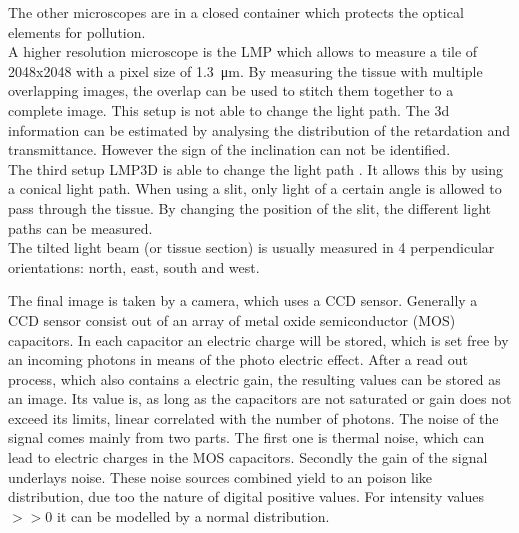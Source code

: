 The other microscopes are in a closed container which protects the optical elements for pollution.
\\
A higher resolution microscope is the \ac{LMP} which allows to measure a tile of 2048x2048 with a pixel size of \SI{1.3}{\micro\meter}.
By measuring the tissue with multiple overlapping images, the overlap can be used to stitch them together to a complete image.
This setup is not able to change the light path.
The 3d information can be estimated by analysing the distribution of the retardation and transmittance.
However the sign of the inclination can not be identified.
\\
The third setup \ac{LMP3D} is able to change the light path \cite{Wiese:887678}.
It allows this by using a conical light path.
When using a slit, only light of a certain angle is allowed to pass through the tissue.
By changing the position of the slit, the different light paths can be measured.
\\
% 
The tilted light beam (or tissue section) is usually measured in 4 perpendicular orientations: north, east, south and west.
\par
% 
The final image is taken by a camera, which uses a \ac{CCD} sensor.
Generally a \ac{CCD} sensor consist out of an array of metal oxide semiconductor (MOS) capacitors.
In each capacitor an electric charge will be stored, which is set free by an incoming photons in means of the photo electric effect.
After a read out process, which also contains a electric gain, the resulting values can be stored as an image.
Its value is, as long as the capacitors are not saturated or gain does not exceed its limits, linear correlated with the number of photons.
The noise of the signal comes mainly from two parts.
The first one is thermal noise, which can lead to electric charges in the MOS capacitors.
Secondly the gain of the signal underlays noise.
These noise sources combined yield to an poison like distribution, due too the nature of digital positive values.
For intensity values $>> 0$ it can be modelled by a normal distribution.
% 
% 
% 
